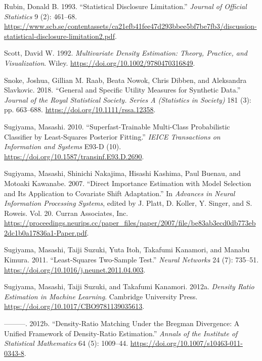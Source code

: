 \documentclass[
]{article}
\newlength{\cslhangindent}
\newlength{\cslentryspacingunit} %
\newenvironment{CSLReferences}[2] %
 {%
  \setlength{\parindent}{0pt}
  \ifodd #1
  \let\oldpar\par
  \def\par{\hangindent=\cslhangindent\oldpar}
  \fi
  \setlength{\parskip}{#2\cslentryspacingunit}
 }%
 {}
\begin{document}
\begin{CSLReferences}{1}{0}
\leavevmode{}%
Rubin, Donald B. 1993. {``Statistical Disclosure Limitation.''}
\emph{Journal of Official Statistics} 9 (2): 461--68.
\url{https://www.scb.se/contentassets/ca21efb41fee47d293bbee5bf7be7fb3/discussion-statistical-disclosure-limitation2.pdf}.

\leavevmode{}%
Scott, David W. 1992. \emph{Multivariate Density Estimation: Theory,
Practice, and Visualization}. Wiley.
\url{https://doi.org/10.1002/9780470316849}.

\leavevmode{}%
Snoke, Joshua, Gillian M. Raab, Beata Nowok, Chris Dibben, and
Aleksandra Slavkovic. 2018. {``General and Specific Utility Measures for
Synthetic Data.''} \emph{Journal of the Royal Statistical Society.
Series A (Statistics in Society)} 181 (3): pp. 663--688.
\url{https://doi.org/10.1111/rssa.12358}.

\leavevmode{}%
Sugiyama, Masashi. 2010. {``Superfast-Trainable Multi-Class
Probabilistic Classifier by Least-Squares Posterior Fitting.''}
\emph{IEICE Transactions on Information and Systems} E93-D (10).
\url{https://doi.org/10.1587/transinf.E93.D.2690}.

\leavevmode{}%
Sugiyama, Masashi, Shinichi Nakajima, Hisashi Kashima, Paul Buenau, and
Motoaki Kawanabe. 2007. {``Direct Importance Estimation with Model
Selection and Its Application to Covariate Shift Adaptation.''} In
\emph{Advances in Neural Information Processing Systems}, edited by J.
Platt, D. Koller, Y. Singer, and S. Roweis. Vol. 20. Curran Associates,
Inc.
\url{https://proceedings.neurips.cc/paper_files/paper/2007/file/be83ab3ecd0db773eb2dc1b0a17836a1-Paper.pdf}.

\leavevmode{}%
Sugiyama, Masashi, Taiji Suzuki, Yuta Itoh, Takafumi Kanamori, and
Manabu Kimura. 2011. {``Least-Squares Two-Sample Test.''} \emph{Neural
Networks} 24 (7): 735--51.
\url{https://doi.org/10.1016/j.neunet.2011.04.003}.

\leavevmode{}%
Sugiyama, Masashi, Taiji Suzuki, and Takafumi Kanamori. 2012a.
\emph{Density Ratio Estimation in Machine Learning}. Cambridge
University Press. \url{https://doi.org/10.1017/CBO9781139035613}.

\leavevmode{}%
---------. 2012b. {``Density-Ratio Matching Under the Bregman
Divergence: A Unified Framework of Density-Ratio Estimation.''}
\emph{Annals of the Institute of Statistical Mathematics} 64 (5):
1009--44. \url{https://doi.org/10.1007/s10463-011-0343-8}.


\end{CSLReferences}
\end{document}
